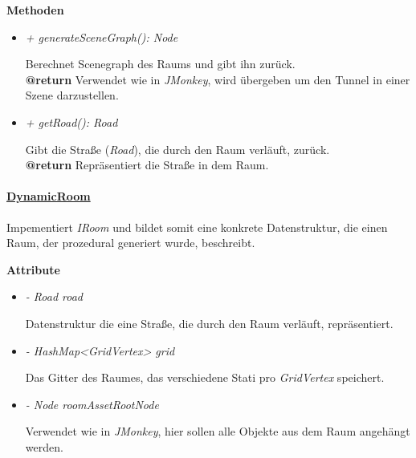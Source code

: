             \textbf{Methoden}					
            \begin{itemize}
                \item  \textit{+ generateSceneGraph(): Node}
                    \begin{leftbar}[0.9\linewidth]
                        Berechnet Scenegraph des Raums und gibt ihn zurück.\\
                        \textbf{@return}  Verwendet wie in \textit{JMonkey}, wird übergeben um den Tunnel in einer Szene darzustellen.
                    \end{leftbar}

                \item  \textit{+ getRoad(): Road}
                    \begin{leftbar}[0.9\linewidth]
                        Gibt die Straße (\textit{Road}), die durch den Raum verläuft, zurück.\\
                        \textbf{@return} Repräsentiert die Straße in dem Raum.
                    \end{leftbar}    
            \end{itemize}
        
        
        \pagebreak
        \paragraph{\underline{DynamicRoom}} \mbox{}\par
            Impementiert \textit{IRoom} und bildet somit eine konkrete Datenstruktur, die einen Raum, der prozedural generiert wurde, beschreibt.\par
            
            \textbf{Attribute}
            \begin{itemize}
                \item  \textit{- Road road} 
                    \begin{leftbar}[0.9\linewidth]
                        Datenstruktur die eine Straße, die durch den Raum verläuft, repräsentiert.
                    \end{leftbar}
                
                \item  \textit{- HashMap<GridVertex> grid} 
                    \begin{leftbar}[0.9\linewidth]
                        Das Gitter des Raumes, das verschiedene Stati pro \textit{GridVertex} speichert.
                    \end{leftbar}
                
                \item  \textit{- Node roomAssetRootNode} 
                    \begin{leftbar}[0.9\linewidth]
                        Verwendet wie in \textit{JMonkey}, hier sollen alle Objekte aus dem Raum angehängt werden.
                    \end{leftbar}
            \end{itemize}

